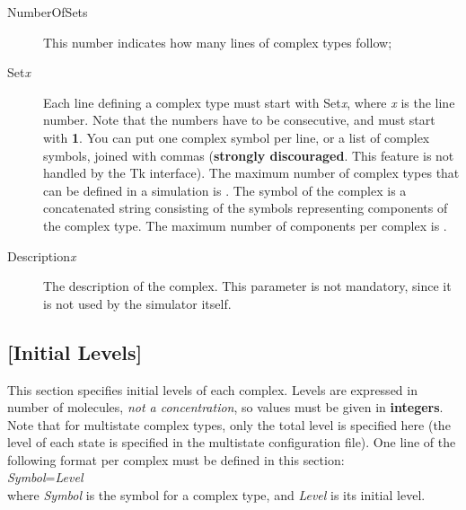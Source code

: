\begin{description}
  
\item[NumberOfSets] This number indicates how many lines of complex
  types follow;
  
\item[Set\emph{x}] Each line defining a complex type must start with
  Set\emph{x}, where \emph{x} is the line number. Note that the
  numbers have to be consecutive, and must start with \textbf{1}.  You
  can put one complex symbol per line, or a list of complex symbols,
  joined with commas (\textbf{strongly discouraged}. This feature is
  not handled by the Tk interface).  The maximum number of
  complex types that can be defined in a simulation is
  \MAXCOMPLEXTYPES{}. The symbol of the complex is a concatenated
  string consisting of the symbols representing components of the
  complex type.  The maximum number of components per complex is
  \MAXCOMPONENTSINCOMPLEX{}.
  

\item[Description\emph{x}] The description of the complex.  This parameter
is not mandatory, since it is not used by the \stochsim{} simulator
itself.
\end{description}

\subsection{[Initial Levels]}
This section specifies initial levels of each complex. Levels are
expressed in number of molecules, \emph{not a concentration}, so
values must be given in \textbf{integers}.  Note that for multistate
complex types, only the total level is specified here (the level of
each state is specified in the multistate configuration file).  One
line of the following format per complex must be defined in this
section: \\[\baselineskip] \emph{Symbol}=\emph{Level}
\\[\baselineskip] 
where \emph{Symbol} is the symbol for a complex type, and \emph{Level}
is its initial level.

